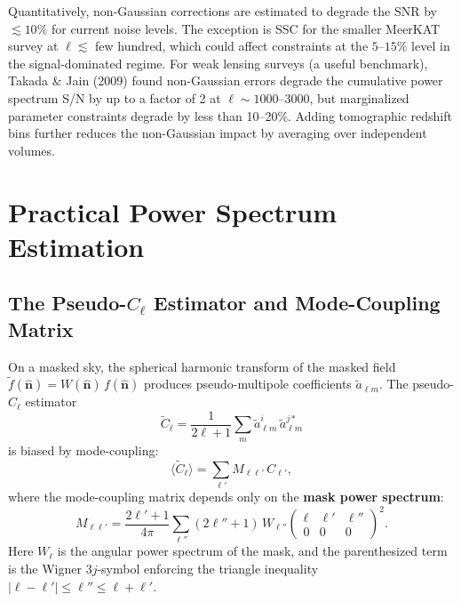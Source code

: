 \documentclass[10pt,a4paper]{article}
\newcommand{\Cl}{C_\ell}
\newcommand{\nhat}{\hat{\mathbf{n}}}
\begin{document}
Quantitatively, non-Gaussian corrections are estimated to degrade the SNR by $\lesssim 10\%$ for current noise levels. The exception is SSC for the smaller MeerKAT survey at $\ell \lesssim$ few hundred, which could affect constraints at the $5$--$15\%$ level in the signal-dominated regime. For weak lensing surveys (a useful benchmark), Takada \& Jain (2009) found non-Gaussian errors degrade the cumulative power spectrum S/N by up to a factor of 2 at $\ell \sim 1000$--$3000$, but marginalized parameter constraints degrade by less than 10--20\%. Adding tomographic redshift bins further reduces the non-Gaussian impact by averaging over independent volumes.


\section{Practical Power Spectrum Estimation}
\label{sec:practical}

\subsection{The Pseudo-$\Cl$ Estimator and Mode-Coupling Matrix}

On a masked sky, the spherical harmonic transform of the masked field $\tilde{f}(\nhat) = W(\nhat)\, f(\nhat)$ produces pseudo-multipole coefficients $\tilde{a}_{\ell m}$. The pseudo-$\Cl$ estimator
\begin{equation}
\tilde{C}_\ell = \frac{1}{2\ell+1}\sum_m \tilde{a}_{\ell m}^i\, \tilde{a}_{\ell m}^{j*}
\end{equation}
is biased by mode-coupling:
\begin{equation}
\langle \tilde{C}_\ell \rangle = \sum_{\ell'} M_{\ell\ell'}\, C_{\ell'},
\label{eq:mode_coupling_bias}
\end{equation}
where the mode-coupling matrix depends only on the \textbf{mask power spectrum}:
\begin{equation}
M_{\ell\ell'} = \frac{2\ell'+1}{4\pi}
\sum_{\ell''} (2\ell''+1)\, W_{\ell''}
\begin{pmatrix} \ell & \ell' & \ell'' \\ 0 & 0 & 0 \end{pmatrix}^2.
\label{eq:mode_coupling_matrix}
\end{equation}
Here $W_\ell$ is the angular power spectrum of the mask, and the parenthesized term is the Wigner $3j$-symbol enforcing the triangle inequality $|\ell - \ell'| \leq \ell'' \leq \ell + \ell'$.
\end{document}
